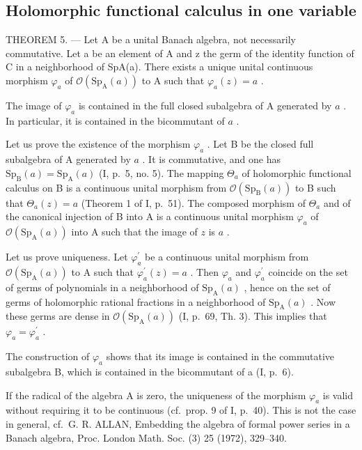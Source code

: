 \subsection{Holomorphic functional calculus in one variable}

THEOREM 5. --- Let A be a unital Banach algebra, not necessarily commutative. Let a be an element of A and z the germ of the identity function of C in a neighborhood of SpA(a). There exists a unique unital continuous morphism \(\varphi_{a}\) of \(\mathcal{O}(\mathrm{Sp}_{\mathrm{A}}(a))\) to A such that \(\varphi_{a}(z)=a\) .

The image of \(\varphi_{a}\) is contained in the full closed subalgebra of A generated by \(a\) . In particular, it is contained in the bicommutant of \(a\) .

Let us prove the existence of the morphism \(\varphi_{a}\) . Let B be the closed full subalgebra of A generated by \(a\) . It is commutative, and one has \(\mathrm{Sp}_{\mathrm{B}}(a) = \mathrm{Sp}_{\mathrm{A}}(a)\) (I, p.~5, no. 5). The mapping \(\Theta_{a}\) of holomorphic functional calculus on B is a continuous unital morphism from \(\mathcal{O}(\mathrm{Sp}_{\mathrm{B}}(a))\) to B such that \(\Theta_{a}(z) = a\) (Theorem 1 of I, p.~51). The composed morphism of \(\Theta_{a}\) and of the canonical injection of B into A is a continuous unital morphism \(\varphi_{a}\) of \(\mathcal{O}(\mathrm{Sp}_{\mathrm{A}}(a))\) into A such that the image of \(z\) is \(a\) .

Let us prove uniqueness. Let \(\varphi_{a}^{\prime}\) be a continuous unital morphism from \(\mathcal{O}(\mathrm{Sp}_{\mathrm{A}}(a))\) to A such that \(\varphi_{a}^{\prime}(z)=a\) . Then \(\varphi_{a}\) and \(\varphi_{a}^{\prime}\) coincide on the set of germs of polynomials in a neighborhood of \(\mathrm{Sp}_{\mathrm{A}}(a)\) , hence on the set of germs of holomorphic rational fractions in a neighborhood of \(\mathrm{Sp}_{\mathrm{A}}(a)\) . Now these germs are dense in \(\mathcal{O}(\mathrm{Sp}_{\mathrm{A}}(a))\) (I, p.~69, Th. 3). This implies that \(\varphi_{a}=\varphi_{a}^{\prime}\) .

The construction of \(\varphi_{a}\) shows that its image is contained in the commutative subalgebra B, which is contained in the bicommutant of a (I, p.~6).

If the radical of the algebra A is zero, the uniqueness of the morphism \(\varphi_{a}\) is valid without requiring it to be continuous (cf.~prop. 9 of I, p.~40). This is not the case in general, cf.~G. R. ALLAN, Embedding the algebra of formal power series in a Banach algebra, Proc. London Math. Soc. (3) 25 (1972), 329--340.

